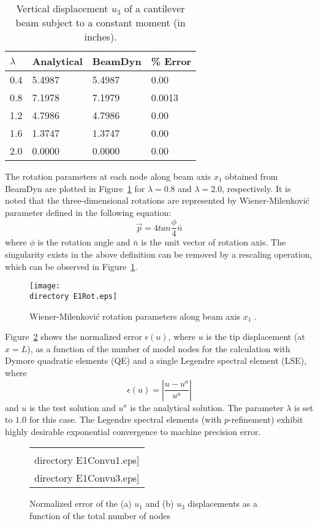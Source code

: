 \begin{table}[tbp]
\centering 
\caption{Vertical displacement $u_3$ of a cantilever beam subject to a constant moment (in inches).}
\label{E1u3} 
	\begin{tabular}{| l | l | l | l |}
    	\hline
    	$\lambda$ & Analytical & BeamDyn & \% Error \\ \hline
    	0.4       & 5.4987     & 5.4987  & 0.00   \\ \hline
    	0.8       & 7.1978     & 7.1979  & 0.0013   \\ \hline
    	1.2       & 4.7986     & 4.7986  & 0.00   \\ \hline
    	1.6       & 1.3747     & 1.3747  & 0.00   \\ \hline
    	2.0       & 0.0000     & 0.0000  & 0.00   \\ \hline
    \end{tabular}
 \end{table}
 The rotation parameters at each node along beam axis $x_1$ obtained from BeamDyn are plotted in Figure~\ref{E1Rot} for $\lambda = 0.8$ and $\lambda = 2.0$, respectively. It is noted that the three-dimensional rotations are represented by Wiener-Milenkovi\'c parameter defined in the following equation:
 \begin{equation}
     \vec{p} = 4 tan\frac{\phi}{4} \bar{n}
     \label{WMParameter}
 \end{equation}
 where $\phi$ is the rotation angle and $\bar{n}$ is the unit vector of rotation axis. The singularity exists in the above definition can be removed by a rescaling operation, which can be observed in Figure~\ref{E1Rot}.
\begin{figure}
    \centering
    \texttt{[image: \\directory E1Rot.eps]}
    \caption{Wiener-Milenkovi\'c rotation parameters along beam axis $x_1$ .}
    \label{E1Rot}
\end{figure}
Figure~\ref{E1Conv} shows the normalized error $\epsilon(u)$, where $u$ is the tip displacement (at $x=L$), as a function of the number of model nodes for the calculation with Dymore quadratic elements (QE) and a single Legendre spectral element (LSE), where
\begin{equation}
    \label{E1Error}
    \epsilon(u) = \left| \frac{u-u^a}{u^a} \right|
\end{equation}
and $u$ is the test solution and $u^a$ is the analytical solution. The parameter $\lambda$ is set to $1.0$ for this case. The Legendre spectral elements (with $p$-refinement) exhibit highly desirable exponential convergence to machine precision error.
\begin{figure}
    \centering
    \begin{tabular}{c}
    \subfloat[$u_1$]{\label{E1Conv:u1}\texttt{[image: \\directory  E1Convu1.eps]}} \qquad
\subfloat[$u_3$]{\label{E1Conv:u3}\texttt{[image: \\directory  E1Convu3.eps]}}\\
\end{tabular}
\caption{Normalized error of the (a) $u_1$ and (b) $u_3$ displacements as a function of the total number of nodes}
\label{E1Conv}
\end{figure}

